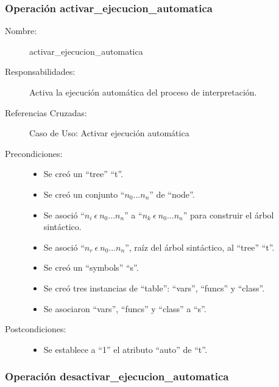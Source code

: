 \subsubsection{Operación activar\_ejecucion\_automatica}

	\begin{description}
		\item [Nombre:] activar\_ejecucion\_automatica
		\item [Responsabilidades:] Activa la ejecución automática del proceso de interpretación.
		\item [Referencias Cruzadas: ] Caso de Uso: Activar ejecución automática
      \item [Precondiciones:] \hfill
         \begin {itemize}
         \item Se creó un ``tree'' ``t''.
         \item Se creó un conjunto ``$n_0...n_n$'' de ``node''.
         \item Se asoció ``$n_i\ \epsilon\ n_0...n_n$'' a ``$n_k\ \epsilon\ n_0...n_n$'' para construir el árbol sintáctico.
         \item Se asoció  ``$n_r\ \epsilon\ n_0...n_n$'', raíz del árbol sintáctico, al ``tree'' ``t''.
         \item Se creó un ``symbols'' ``s''.
         \item Se creó tres instancias de ``table'': ``vars'', ``funcs'' y ``class''.
         \item Se asociaron ``vars'', ``funcs'' y ``class'' a ``s''.
      \end{itemize}
      \item [Postcondiciones:] \hfill
      \begin {itemize}
         \item Se establece a ``1'' el atributo ``auto'' de ``t''.
      \end{itemize}
	\end{description} 


\subsubsection{Operación desactivar\_ejecucion\_automatica}

